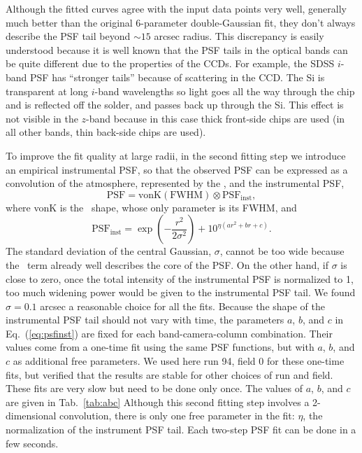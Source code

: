 Although the fitted
curves agree with the input data points very well, generally much better than the
original 6-parameter double-Gaussian fit, they don't always describe
the PSF tail beyond $\sim 15$ arcsec radius. This discrepancy is easily understood
because it is well known that the PSF tails in the optical bands can be quite
different due to the properties of the CCDs.
For example, the SDSS $i$-band PSF has ``stronger tails''
because of scattering in the CCD.  The Si is transparent at long $i$-band wavelengths 
so light goes all the way through the chip and is reflected off the solder, and passes 
back up through the Si. This effect is not visible in the $z$-band because in this case
thick front-side chips are used (in all other bands, thin back-side chips are used). 

To improve the fit quality at large radii, in the second fitting step we introduce an
empirical instrumental PSF, so that the observed PSF can be expressed as
a convolution of the atmosphere, represented by the \vk, and
the instrumental PSF,
\begin{equation}
        \textrm{PSF} = \textrm{vonK} (\textrm{FWHM}) \otimes \textrm{PSF}_{\textrm{inst}},
\end{equation} 
where vonK is the \vk~shape, whose only parameter is its FWHM, and
\begin{equation}
        \textrm{PSF}_{\textrm{inst}} = \exp(-\frac{r^2}{2\sigma^2}) + 10^{\eta(ar^2+br+c)}.
\label{eq:psfinst}
\end{equation} 
The standard deviation of the central Gaussian, $\sigma$, cannot be
too wide because the \vk~term already well describes the core of the PSF.
On the other hand, if $\sigma$ is close to zero, once the
total intensity of the instrumental PSF is normalized to 1, too much
widening power would be given to the instrumental PSF tail.
We found $\sigma = 0.1$ arcsec a reasonable choice for all the fits.
Because the shape of the instrumental PSF tail should not vary with
time, the parameters $a$, $b$, and $c$ in Eq.~(\ref{eq:psfinst}) are
fixed for each band-camera-column combination.
Their values come from a one-time fit using the same PSF functions,
but with $a$, $b$, and $c$ as additional free parameters.
We used here run 94, field 0 for these one-time fits, but verified that 
the results are stable for other choices of run and field. 
These fits are very slow but need to be done only once.
The values of $a$, $b$, and $c$ are given in Tab.~\ref{tab:abc}
Although this second fitting step involves a 2-dimensional convolution,
there is only one free parameter in the fit: $\eta$, the normalization of the
instrument PSF tail. Each two-step PSF fit can be done in a few seconds.


